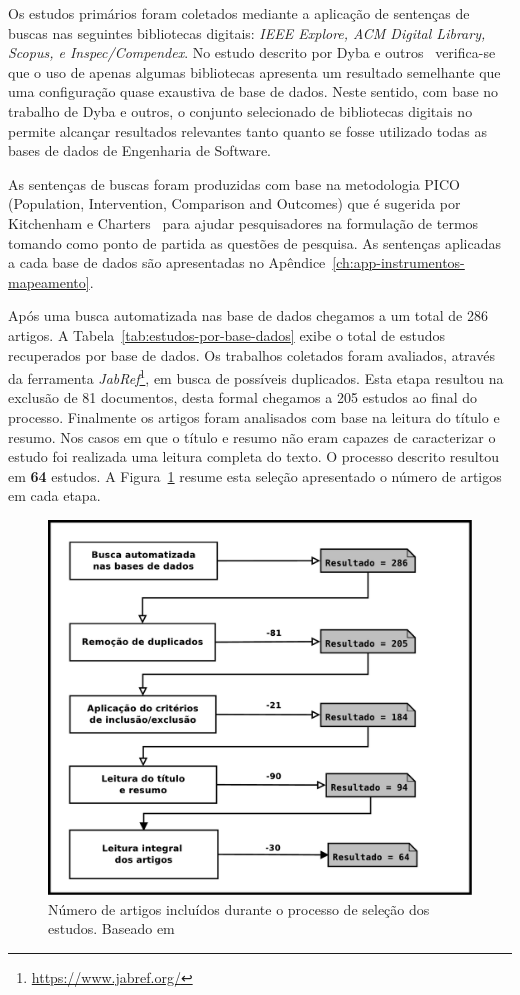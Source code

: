 Os estudos primários foram coletados mediante a aplicação de sentenças de buscas
nas seguintes bibliotecas digitais: \textit{IEEE Explore, ACM Digital Library,
	Scopus, e Inspec/Compendex}. No estudo descrito por Dyba e
outros~\cite{dybaa2007applying} verifica-se que o uso de apenas algumas
bibliotecas apresenta um resultado semelhante que uma configuração quase
exaustiva de base de dados. Neste sentido, com base no trabalho de Dyba e
outros, o conjunto selecionado de bibliotecas digitais no permite alcançar
resultados relevantes tanto quanto se fosse utilizado todas as bases de dados de
Engenharia de Software.

As sentenças de buscas foram produzidas com base na metodologia PICO
(Population, Intervention, Comparison and Outcomes) que é sugerida por
Kitchenham e Charters~\cite{keele2007guidelines} para ajudar pesquisadores na
formulação de termos tomando como ponto de partida as questões de pesquisa. As
sentenças aplicadas a cada base de dados são apresentadas no
Apêndice~\ref{ch:app-instrumentos-mapeamento}.

Após uma busca automatizada nas base de dados chegamos a um total de 286
artigos. A Tabela~\ref{tab:estudos-por-base-dados} exibe o total de estudos
recuperados por base de dados.  Os trabalhos coletados foram avaliados, através
da ferramenta \textit{JabRef}\footnote{\url{https://www.jabref.org/}}, em busca
de possíveis duplicados. Esta etapa resultou na exclusão de 81 documentos, desta
formal chegamos a 205 estudos ao final do processo. Finalmente os artigos foram
analisados com base na leitura do título e resumo. Nos casos em que o título e
resumo não eram capazes de caracterizar o estudo foi realizada uma leitura
completa do texto. O processo descrito resultou em \textbf{64} estudos. A
Figura~\ref{fig:diagrama-processo-selecao} resume esta seleção apresentado o
número de artigos em cada etapa.

\begin{figure} \centering \includegraphics[width=0.75\linewidth]
	{./chapter-mapeamento-sistematico/img/diagrama-processo-selecao.pdf}
	\caption{Número de artigos incluídos durante o processo de seleção dos
		estudos. Baseado
		em~\cite{Petersen2015}}\label{fig:diagrama-processo-selecao}
\end{figure}

